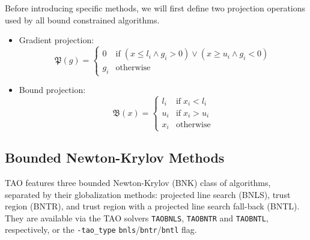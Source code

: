 \documentclass[]{book}
\begin{document}
Before introducing specific methods, we will first define two projection operations 
used by all bound constrained algorithms.
\begin{itemize}
\item Gradient projection:
\[
\mathfrak{P}(g) = \left\{\begin{array}{ll}
0 & \mbox{if} \; (x \leq l_i \land g_i > 0) \lor (x \geq u_i \land g_i < 0) \\
g_i & \mbox{otherwise}
\end{array}
\right.
\]
\item Bound projection:
\[
\mathfrak{B}(x) = \left\{\begin{array}{ll}
l_i & \mbox{if} \; x_i < l_i \\
u_i & \mbox{if} \; x_i > u_i \\
x_i & \mbox{otherwise}
\end{array}
\right.
\]
\end{itemize}

\subsection{Bounded Newton-Krylov Methods}%
\label{sec:bnk}

TAO features three bounded Newton-Krylov (BNK) class of algorithms, separated by their 
globalization methods: projected line search (BNLS), trust region (BNTR), and trust region 
with a projected line search fall-back (BNTL). They are available via the TAO 
solvers {\tt TAOBNLS}, {\tt TAOBNTR} and {\tt TAOBNTL}, respectively, or the 
{\tt -tao\_type} {\tt bnls}/{\tt bntr}/{\tt bntl} flag.
\end{document}

